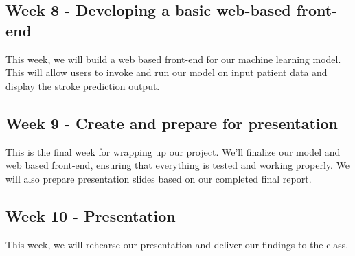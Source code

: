 \documentclass[11pt]{article}
\begin{document}
\subsection*{Week 8 - Developing a basic web-based front-end }
This week, we will build a web based front-end for our machine learning model. This will allow users to invoke and run our model on input patient data and display the stroke prediction output.

\subsection*{Week 9 - Create and prepare for presentation}
This is the final week for wrapping up our project. We’ll finalize our model and web based front-end, ensuring that everything is tested and working properly. We will also prepare presentation slides based on our completed final report. 

\subsection*{Week 10 - Presentation}
This week, we will rehearse our presentation and deliver our findings to the class.
\end{document}
